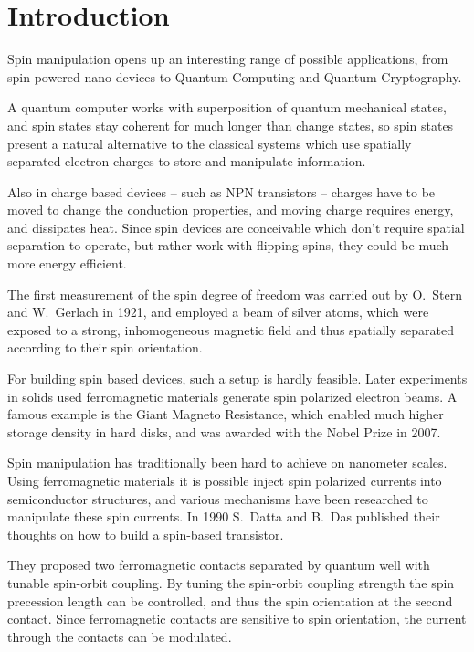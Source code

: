 \chapter{Introduction}

Spin manipulation opens up an interesting range of possible applications, from
spin powered nano devices to Quantum Computing and Quantum Cryptography.

A quantum computer works with superposition of quantum mechanical states, and
spin states stay coherent for much longer than change states, so spin states
present a natural alternative to the classical systems which use spatially
separated electron charges to store and manipulate information.

Also in charge based devices -- such as NPN transistors -- charges have to be
moved to change the conduction properties, and moving charge requires energy,
and dissipates heat. Since spin devices are conceivable which don't require
spatial separation to operate, but rather work with flipping spins, they could
be much more energy efficient.

The first measurement of the spin degree of freedom was carried out by O.~Stern
and W.~Gerlach in 1921\cite{stern-gerlach}, and employed a beam of silver atoms,
which were
exposed to a strong, inhomogeneous magnetic field and thus spatially separated
according to their spin orientation.

For building spin based devices, such a setup is hardly feasible. Later
experiments in solids used ferromagnetic materials generate spin polarized
electron beams. A famous example is the Giant Magneto Resistance, which
enabled much higher storage density in hard disks, and was awarded with the
Nobel Prize in 2007.

Spin manipulation has traditionally been hard to achieve on nanometer
scales. Using ferromagnetic materials it is possible inject spin polarized
currents into semiconductor structures, and various mechanisms have been
researched to manipulate these spin currents. In 1990 S.~Datta and B.~Das
published their thoughts on how to build a spin-based
transistor\cite{datta-das}.

They proposed two ferromagnetic contacts separated
by quantum well with tunable spin-orbit coupling. By tuning the spin-orbit
coupling strength the spin precession length can be controlled, and thus the
spin orientation at the second contact. Since ferromagnetic contacts are
sensitive to spin orientation, the current through the contacts can be
modulated.

